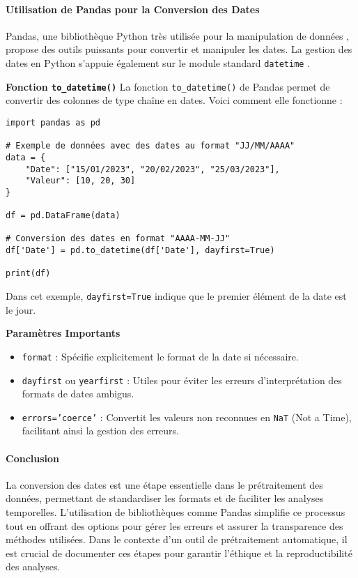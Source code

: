 \documentclass{article}
\begin{document}
\paragraph*{Utilisation de Pandas pour la Conversion des Dates}
Pandas, une bibliothèque Python très utilisée pour la manipulation de données \cite{pandas_docs}, propose des outils puissants pour convertir et manipuler les dates. La gestion des dates en Python s'appuie également sur le module standard \texttt{datetime} \cite{python_datetime}.

\textbf{Fonction \texttt{to\_datetime()}}
La fonction \texttt{to\_datetime()} de Pandas permet de convertir des colonnes de type chaîne en dates. Voici comment elle fonctionne :

\begin{verbatim}
import pandas as pd

# Exemple de données avec des dates au format "JJ/MM/AAAA"
data = {
    "Date": ["15/01/2023", "20/02/2023", "25/03/2023"],
    "Valeur": [10, 20, 30]
}

df = pd.DataFrame(data)

# Conversion des dates en format "AAAA-MM-JJ"
df['Date'] = pd.to_datetime(df['Date'], dayfirst=True)

print(df)
\end{verbatim}

Dans cet exemple, \texttt{dayfirst=True} indique que le premier élément de la date est le jour.

\textbf{Paramètres Importants}
\begin{itemize}
    \item \texttt{format} : Spécifie explicitement le format de la date si nécessaire.
    \item \texttt{dayfirst} ou \texttt{yearfirst} : Utiles pour éviter les erreurs d'interprétation des formats de dates ambigus.
    \item \texttt{errors='coerce'} : Convertit les valeurs non reconnues en \texttt{NaT} (Not a Time), facilitant ainsi la gestion des erreurs.
\end{itemize}

\paragraph*{Conclusion}
La conversion des dates est une étape essentielle dans le prétraitement des données, permettant de standardiser les formats et de faciliter les analyses temporelles. L'utilisation de bibliothèques comme Pandas simplifie ce processus tout en offrant des options pour gérer les erreurs et assurer la transparence des méthodes utilisées. Dans le contexte d'un outil de prétraitement automatique, il est crucial de documenter ces étapes pour garantir l'éthique et la reproductibilité des analyses.
\end{document}
